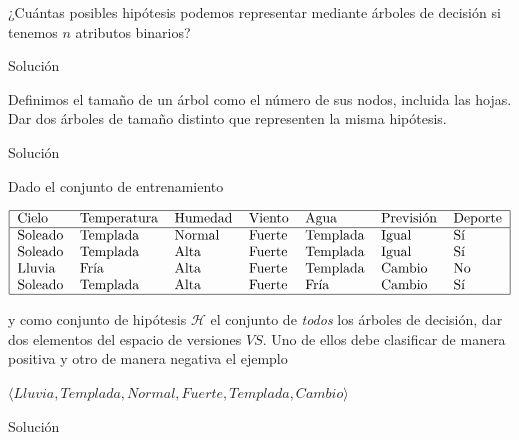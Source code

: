 \documentclass{mulcia_aa}
\begin{document}
\genTitle

\begin{question}
¿Cuántas posibles hipótesis podemos representar mediante árboles de decisión si tenemos $n$ atributos binarios?
\end{question}
\begin{solution}
Solución
\end{solution}

\begin{question}
Definimos el tamaño de un árbol como el número de sus nodos, incluida las hojas. Dar dos árboles de tamaño distinto que representen la misma hipótesis.
\end{question}
\begin{solution}
Solución
\end{solution}

\begin{question}
Dado el conjunto de entrenamiento
\vspace{-10pt}
\begin{table}[!htbp]
\begin{align*}
    \begin{tabular}{|lllllll|}
    \hline
    Cielo   & Temperatura & Humedad & Viento & Agua     & Previsión & Deporte \\ \hline
    Soleado & Templada    & Normal  & Fuerte & Templada & Igual     & Sí      \\
    Soleado & Templada    & Alta    & Fuerte & Templada & Igual     & Sí      \\
    Lluvia  & Fría        & Alta    & Fuerte & Templada & Cambio    & No      \\
    Soleado & Templada    & Alta    & Fuerte & Fría     & Cambio    & Sí      \\ \hline
    \end{tabular}
\end{align*}
\end{table}
\vspace{-20pt}
\begin{flushleft}
y como conjunto de hipótesis $\mathcal{H}$ el conjunto de \emph{todos} los árboles de decisión, dar dos elementos del espacio de versiones $VS$. Uno de ellos debe clasificar de manera positiva y otro de manera negativa el ejemplo
\end{flushleft}

\centering$\langle Lluvia, Templada, Normal, Fuerte, Templada, Cambio \rangle$
\end{question}
\begin{solution}
Solución
\end{solution}
 
\end{document}
